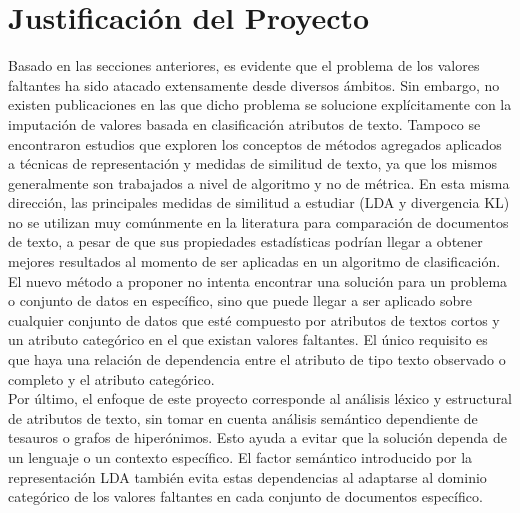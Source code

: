 \section{Justificación del Proyecto}
Basado en las secciones anteriores, es evidente que el problema de los valores faltantes ha sido atacado extensamente desde diversos ámbitos. Sin embargo, no existen publicaciones en las que dicho problema se solucione explícitamente con la imputación de valores basada en clasificación atributos de texto. Tampoco se encontraron estudios que exploren los conceptos de métodos agregados aplicados a técnicas de representación y medidas de similitud de texto, ya que los mismos generalmente son trabajados a nivel de algoritmo y no de métrica. En esta misma dirección, las principales medidas de similitud a estudiar (LDA y divergencia KL) no se utilizan muy comúnmente en la literatura para comparación de documentos de texto, a pesar de que sus propiedades estadísticas podrían llegar a obtener mejores resultados al momento de ser aplicadas en un algoritmo de clasificación. \\
El nuevo método a proponer no intenta encontrar una solución para un problema o conjunto de datos en específico, sino que puede llegar a ser aplicado sobre cualquier conjunto de datos que esté compuesto por atributos de textos cortos y un atributo categórico en el que existan valores faltantes. El único requisito es que haya una relación de dependencia entre el atributo de tipo texto observado o completo y el atributo categórico. \\
Por último, el enfoque de este proyecto corresponde al análisis léxico y estructural de atributos de texto, sin tomar en cuenta análisis semántico dependiente de tesauros o grafos de hiperónimos. Esto ayuda a evitar que la solución dependa de un lenguaje o un contexto específico. El factor semántico introducido por la representación LDA también evita estas dependencias al adaptarse al dominio categórico de los valores faltantes en cada conjunto de documentos específico.
